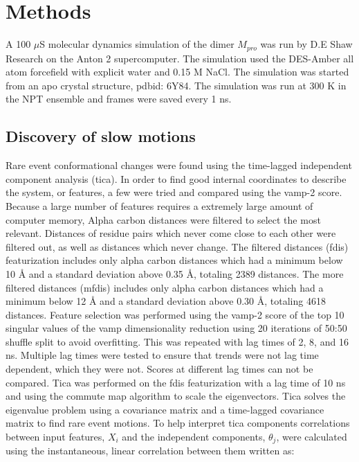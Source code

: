 \documentclass{biophys-new}
\begin{document}
\section*{Methods}

A 100 $\mu$S molecular dynamics simulation of the dimer $M_{pro}$ was run by D.E Shaw Research on the Anton 2 supercomputer.\cite{shaw2020molecular} The simulation used the DES-Amber all atom forcefield\cite{piana2020development} with explicit water and 0.15 M NaCl. The simulation was started from an apo crystal structure, pdbid: 6Y84. The simulation was run at 300 K in the NPT ensemble and frames were saved every 1 ns.

\subsection*{Discovery of slow motions}

Rare event conformational changes were found using the time-lagged independent component analysis (tica).\cite{perez2013identification,schwantes2013improvements} In order to find good internal coordinates to describe the system, or features, a few were tried and compared using the vamp-2 score.\cite{wu2020variational, scherer2019variational} Because a large number of features requires a extremely large amount of computer memory, Alpha carbon distances were filtered to select the most relevant. Distances of residue pairs which never come close to each other were filtered out, as well as distances which never change. The filtered distances (fdis) featurization includes only alpha carbon distances which had a minimum below 10 Å and a standard deviation above 0.35 Å, totaling 2389 distances. The more filtered distances (mfdis) includes only alpha carbon distances which had a minimum below 12 Å and a standard deviation above 0.30 Å, totaling 4618 distances. Feature selection was performed using the vamp-2 score\cite{wu2020variational, scherer2019variational} of the top 10 singular values of the vamp dimensionality reduction using 20 iterations of 50:50 shuffle split to avoid overfitting. This was repeated with lag times of 2, 8, and 16 ns. Multiple lag times were tested to ensure that trends were not lag time dependent, which they were not. Scores at different lag times can not be compared.\cite{husic2017note} Tica was performed on the fdis featurization with a lag time of 10 ns and using the commute map algorithm to scale the eigenvectors.\cite{noe2016commute} Tica solves the eigenvalue problem using a covariance matrix and a time-lagged covariance matrix to find rare event motions. To help interpret tica components correlations between input features, $X_i$ and the independent components, $\theta_j$, were calculated using the instantaneous, linear correlation between them written as:
\end{document}
